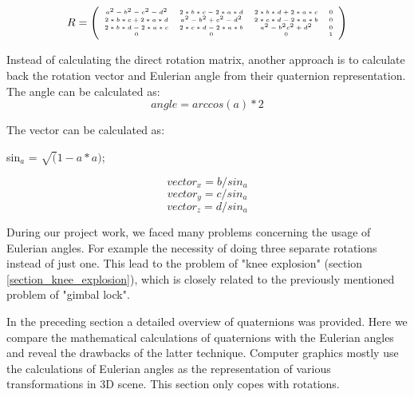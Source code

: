 \documentclass[times, 10pt,twocolumn]{article}
\begin{document}
\[ R = \left( \begin{tiny}\begin{array}{cccc}
a^{2}-b^{2}-c^{2}-d^{2} & 2 \ast b \ast c-2 \ast a \ast d & 2 \ast b \ast d+2 \ast a \ast c & 0 \\
2 \ast b \ast c+2 \ast a \ast d & a^{2}-b^{2}+c^{2}-d^{2} & 2 \ast c \ast d-2 \ast a \ast b & 0 \\
2 \ast b \ast d-2 \ast a \ast c & 2 \ast c \ast d-2 \ast a \ast b & a^{2}-b^{2}c^{2}+d^{2} & 0 \\
0 & 0 & 0 & 1
\end{array}\end{tiny} \right)\]

Instead of calculating the direct rotation matrix, another approach is to calculate back the rotation vector and Eulerian angle from their quaternion representation. The angle can be calculated as:
\begin{equation}
\label{eq_quant1}
	angle = arccos(a) \ast 2
\end{equation}

The vector can be calculated as:

\begin{description}
    \setlength{\itemsep}{0pt}
    \item sin$_a$ = $\sqrt(1 - a \ast a)$;
\end{description}

\begin{equation}
\label{eq_quant2}
	vector_x = b / sin_a
\end{equation}
\begin{equation}
\label{eq_quant3}
	vector_y = c / sin_a
\end{equation}
\begin{equation}
\label{eq_quant4}
	vector_z = d / sin_a
\end{equation}

\label{QuaternionsVsEuler}

During our project work, we faced many problems concerning the usage of Eulerian angles. For example the necessity of doing three separate rotations instead of just one. This lead to the problem of "knee explosion" (section \ref{section_knee_explosion}), which is closely related to the previously mentioned problem of "gimbal lock".

In the preceding section a detailed overview of quaternions was provided. Here we compare the mathematical calculations of quaternions with the Eulerian angles and reveal the drawbacks of the latter technique.
Computer graphics mostly use the calculations of Eulerian angles as the representation of various transformations in 3D scene. This section only copes with rotations.
\end{document}
